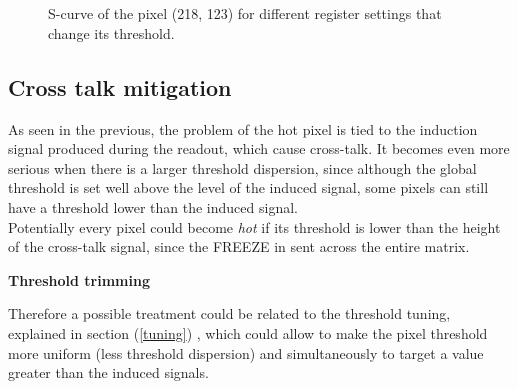 \begin{figure}[h!]
\centering
{}\quad
{}\\
\\
\caption{S-curve of the pixel (218, 123) for different register settings that change its threshold.}
\label{fig:making_hot}
\end{figure}

 




\subsection{Cross talk mitigation}

As seen in the previous, the problem of the hot pixel is tied to the induction signal produced during the readout, which cause cross-talk. It becomes even more serious when there is a larger threshold dispersion, since although the global threshold is set well above the level of the induced signal, some pixels can still have a threshold lower than the induced signal.\\

Potentially every pixel could become \textit{hot} if its threshold is lower than the height of the cross-talk signal, since the \textsc{FREEZE} in sent across the entire matrix. 


\begin{description}
\item \textbf{Threshold trimming}
\end{description}
 
Therefore a possible treatment could be related to the threshold tuning, explained in section (\vref{tuning}) , which could allow to make the pixel threshold more uniform (less threshold dispersion) and simultaneously to target a value greater than the induced signals. \\

